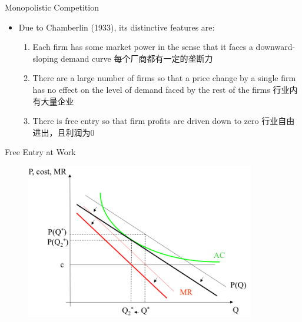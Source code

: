 \documentclass[10pt,hyperref={CJKbookmarks=true},xcolor=dvipsnames,aspectratio=169]{beamer}
\begin{document}
\begin{frame}{Monopolistic Competition }

\begin{itemize}
\item Due to Chamberlin (1933), its distinctive features are: 

\begin{enumerate}
\item Each firm has some market power in the sense that it faces a downward-
sloping demand curve 每个厂商都有一定的垄断力
\item There are a large number of firms so that a price change by a single
firm has no effect on the level of demand faced by the rest of the
firms 行业内有大量企业
\item There is free entry so that firm profits are driven down to zero 行业自由进出，且利润为0
\end{enumerate}
\end{itemize}
\end{frame}

\begin{frame}{Free Entry at Work }


\begin{figure}
\centering{}\includegraphics[width=10cm]{fig/krugman/lec6-14}
\end{figure}



\end{frame}
\end{document}
